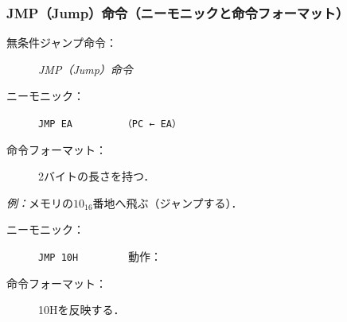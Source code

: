 \documentclass[handout]{beamer}        %
\begin{document}
\begin{frame}
  \frametitle{JMP（Jump）命令（ニーモニックと命令フォーマット）}
  \begin{description}
  \item[無条件ジャンプ命令：]\emph{JMP（Jump）命令}
    \vfill

  \item[ニーモニック：]\texttt{JMP EA}~~~~~~~~~\texttt{（PC ← EA）}
    \vfill

  \item[命令フォーマット：] 2バイトの長さを持つ．\\
  \end{description}
  \vfill

  \emph{例：}メモリの$10_{16}$番地へ飛ぶ（ジャンプする）．
  \begin{description}
  \item[ニーモニック：]\texttt{JMP 10H}~~~~~~~~~動作：

  \item[命令フォーマット：] 10Hを反映する．\\
  \end{description}
  \vfill
\end{frame}
\end{document}
